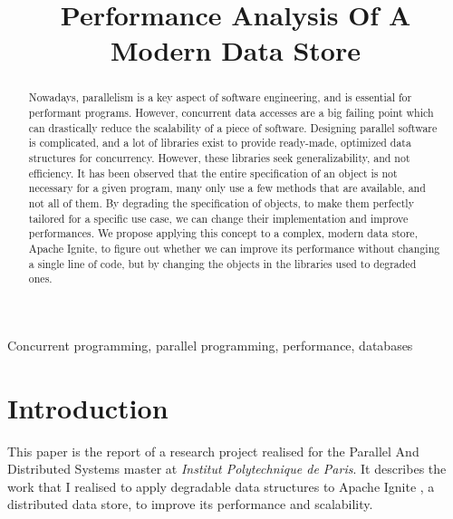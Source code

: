 \documentclass[conference]{IEEEtran}
\begin{document}
\title{Performance Analysis Of A Modern Data Store}

\author{
}

\maketitle
\thispagestyle{plain}
\pagestyle{plain}

\begin{abstract}
Nowadays, parallelism is a key aspect of software engineering, and is essential for performant programs. However, concurrent data accesses are a big failing point which can drastically reduce the scalability of a piece of software. Designing parallel software is complicated, and a lot of libraries exist to provide ready-made, optimized data structures for concurrency. However, these libraries seek generalizability, and not efficiency. It has been observed that the entire specification of an object is not necessary for a given program, many only use a few methods that are available, and not all of them. By degrading the specification of objects, to make them perfectly tailored for a specific use case, we can change their implementation and improve performances. We propose applying this concept to a complex, modern data store, Apache Ignite, to figure out whether we can improve its performance without changing a single line of code, but by changing the objects in the libraries used to degraded ones.

\end{abstract}

\begin{IEEEkeywords}
Concurrent programming, parallel programming, performance, databases
\end{IEEEkeywords}

\bigbreak 

\section{Introduction}
This paper is the report of a research project realised for the Parallel And Distributed Systems master at \textit{Institut Polytechnique de Paris}. It describes the work that I realised to apply degradable data structures to Apache Ignite \cite{ignite}, a distributed data store, to improve its performance and scalability.
\end{document}
